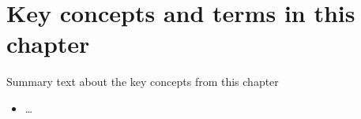 \documentclass[fsharpNotes.tex]{subfiles}
\begin{document}


\section{Key concepts and terms in this chapter}
Summary text about the key concepts from this chapter
\begin{itemize}
\item \ldots
\end{itemize}
\end{document}
